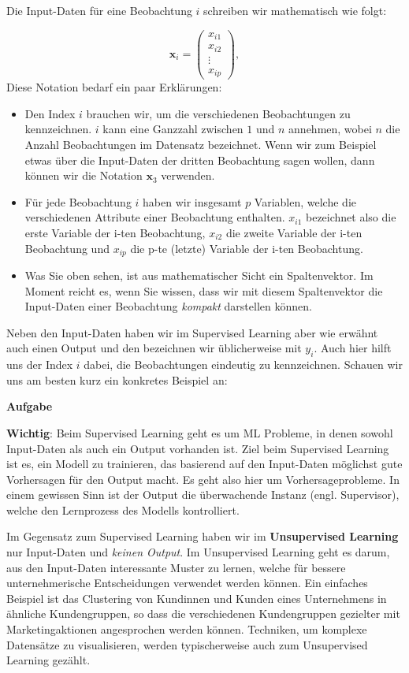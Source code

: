 \documentclass[
]{book}
\providecommand{\tightlist}{%
  \setlength{\itemsep}{0pt}\setlength{\parskip}{0pt}}
\begin{document}
Die Input-Daten für eine Beobachtung \(i\) schreiben wir mathematisch wie folgt:

\[
\mathbf{x}_i=\begin{pmatrix} x_{i1} \\ x_{i2} \\ \vdots \\ x_{ip} \end{pmatrix},
\]
Diese Notation bedarf ein paar Erklärungen:

\begin{itemize}
\tightlist
\item
  Den Index \(i\) brauchen wir, um die verschiedenen Beobachtungen zu kennzeichnen. \(i\) kann eine Ganzzahl zwischen \(1\) und \(n\) annehmen, wobei \(n\) die Anzahl Beobachtungen im Datensatz bezeichnet. Wenn wir zum Beispiel etwas über die Input-Daten der dritten Beobachtung sagen wollen, dann können wir die Notation \(\mathbf{x}_3\) verwenden.
\item
  Für jede Beobachtung \(i\) haben wir insgesamt \(p\) Variablen, welche die verschiedenen Attribute einer Beobachtung enthalten. \(x_{i1}\) bezeichnet also die erste Variable der i-ten Beobachtung, \(x_{i2}\) die zweite Variable der i-ten Beobachtung und \(x_{ip}\) die p-te (letzte) Variable der i-ten Beobachtung.
\item
  Was Sie oben sehen, ist aus mathematischer Sicht ein Spaltenvektor. Im Moment reicht es, wenn Sie wissen, dass wir mit diesem Spaltenvektor die Input-Daten einer Beobachtung \emph{kompakt} darstellen können.
\end{itemize}

Neben den Input-Daten haben wir im Supervised Learning aber wie erwähnt auch einen Output und den bezeichnen wir üblicherweise mit \(y_i\). Auch hier hilft uns der Index \(i\) dabei, die Beobachtungen eindeutig zu kennzeichnen. Schauen wir uns am besten kurz ein konkretes Beispiel an:

\textbf{Aufgabe}

\textbf{Wichtig}: Beim Supervised Learning geht es um ML Probleme, in denen sowohl Input-Daten als auch ein Output vorhanden ist. Ziel beim Supervised Learning ist es, ein Modell zu trainieren, das basierend auf den Input-Daten möglichst gute Vorhersagen für den Output macht. Es geht also hier um Vorhersageprobleme. In einem gewissen Sinn ist der Output die überwachende Instanz (engl. Supervisor), welche den Lernprozess des Modells kontrolliert.

Im Gegensatz zum Supervised Learning haben wir im \textbf{Unsupervised Learning} nur Input-Daten und \emph{keinen Output}. Im Unsupervised Learning geht es darum, aus den Input-Daten interessante Muster zu lernen, welche für bessere unternehmerische Entscheidungen verwendet werden können. Ein einfaches Beispiel ist das Clustering von Kundinnen und Kunden eines Unternehmens in ähnliche Kundengruppen, so dass die verschiedenen Kundengruppen gezielter mit Marketingaktionen angesprochen werden können. Techniken, um komplexe Datensätze zu visualisieren, werden typischerweise auch zum Unsupervised Learning gezählt.
\end{document}
